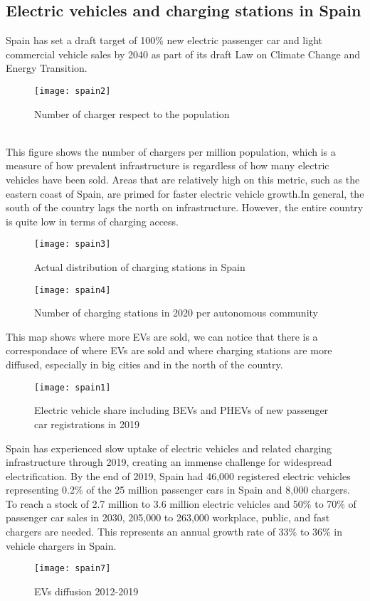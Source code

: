 \documentclass{article}
\begin{document}
\subsection{Electric vehicles and charging stations in Spain}
Spain has set a draft target of 100\% new electric passenger car and light commercial vehicle sales by 2040 as part of its draft Law on Climate Change and Energy Transition.
\begin{figure}[h]
\centering
\texttt{[image: spain2]}
\caption{Number of charger respect to the population \cite{horst1}}
\end{figure}
\\
This figure shows the number of chargers per million population, which is a measure of how prevalent infrastructure is regardless of how many electric vehicles have been sold. Areas that are relatively high on this metric, such as the eastern coast of Spain, are primed for faster electric vehicle growth.In general, the south of the country lags the north on infrastructure. However, the entire country is quite low in terms of charging access.\\
\begin{figure}[H]
\centering
\texttt{[image: spain3]}
\caption{Actual distribution of charging stations in Spain \cite{electromaps}}
\end{figure}

\begin{figure}[H]
\centering
\texttt{[image: spain4]}
\caption{Number of charging stations in 2020 per autonomous community \cite{statista}}
\end{figure}
\newpage

\bigskip
\bigskip
This map shows where more EVs are sold, we can notice that there is a correspondace of where EVs are sold and where charging stations are more diffused, especially in big cities and in the north of the country.
\begin{figure}[H]
\centering
\texttt{[image: spain1]}
\caption{Electric vehicle share including BEVs and PHEVs of new passenger car registrations in 2019 \cite{horst1}}
\end{figure}
Spain has experienced slow uptake of electric vehicles and related charging infrastructure through 2019, creating an immense challenge for widespread electrification. By the end of 2019, Spain had 46,000 registered electric vehicles representing 0.2\% of the 25 million passenger cars in Spain and 8,000 chargers. To reach a stock of 2.7 million to 3.6 million electric vehicles and 50\% to 70\% of passenger car sales in 2030, 205,000 to 263,000 workplace, public, and fast chargers are needed. This represents an annual growth rate of 33\% to 36\% in vehicle chargers in Spain.
\begin{figure}[H]
\centering
\texttt{[image: spain7]}
\caption{EVs diffusion 2012-2019 \cite{iea}}
\end{figure}
\newpage
\end{document}
